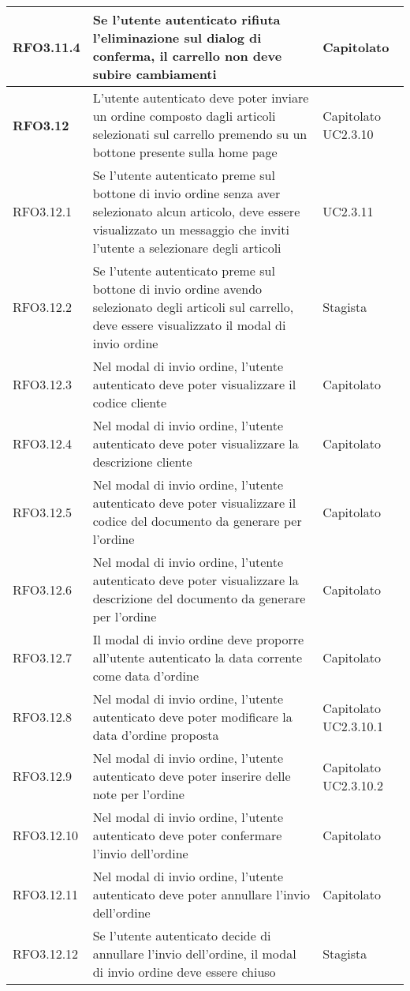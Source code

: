 {\begin{center}
\begin{longtable}{ | >{\centering\arraybackslash}p{2.5cm} | >{\arraybackslash}p{7cm} | >{\centering\arraybackslash}p{2cm} | }
RFO3.11.4 & Se l'utente autenticato rifiuta l'eliminazione sul dialog di conferma, il carrello non deve subire cambiamenti & Capitolato \\ \hline
\textbf{RFO3.12} & L'utente autenticato deve poter inviare un ordine composto dagli articoli selezionati sul carrello premendo su un bottone presente sulla home page & Capitolato UC2.3.10\\ \hline
RFO3.12.1 & Se l'utente autenticato preme sul bottone di invio ordine senza aver selezionato alcun articolo, deve essere visualizzato un messaggio che inviti l'utente a selezionare degli articoli & UC2.3.11 \\ \hline
RFO3.12.2 & Se l'utente autenticato preme sul bottone di invio ordine avendo selezionato degli articoli sul carrello, deve essere visualizzato il modal di invio ordine & Stagista \\ \hline
RFO3.12.3 & Nel modal di invio ordine, l'utente autenticato deve poter visualizzare il codice cliente & Capitolato \\ \hline
RFO3.12.4 & Nel modal di invio ordine, l'utente autenticato deve poter visualizzare la descrizione cliente & Capitolato \\ \hline
RFO3.12.5 & Nel modal di invio ordine, l'utente autenticato deve poter visualizzare il codice del documento da generare per l'ordine & Capitolato \\ \hline
RFO3.12.6 & Nel modal di invio ordine, l'utente autenticato deve poter visualizzare la descrizione del documento da generare per l'ordine & Capitolato \\ \hline
RFO3.12.7 & Il modal di invio ordine deve proporre all'utente autenticato la data corrente come data d'ordine & Capitolato \\ \hline
RFO3.12.8 & Nel modal di invio ordine, l'utente autenticato deve poter modificare la data d'ordine proposta & Capitolato UC2.3.10.1\\ \hline
RFO3.12.9 & Nel modal di invio ordine, l'utente autenticato deve poter inserire delle note per l'ordine & Capitolato UC2.3.10.2\\ \hline
RFO3.12.10 & Nel modal di invio ordine, l'utente autenticato deve poter confermare l'invio dell'ordine & Capitolato \\ \hline
RFO3.12.11 & Nel modal di invio ordine, l'utente autenticato deve poter annullare l'invio dell'ordine & Capitolato \\ \hline
RFO3.12.12 & Se l'utente autenticato decide di annullare l'invio dell'ordine, il modal di invio ordine deve essere chiuso & Stagista \\ \hline

\end{longtable}
\end{center}}
